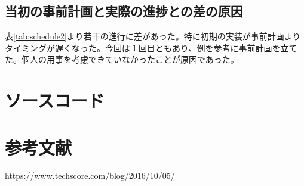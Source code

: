\documentclass[a4j]{jsarticle}
\begin{document}
  \subsection{当初の事前計画と実際の進捗との差の原因}
  表\ref{tab:schedule2}より若干の進行に差があった。特に初期の実装が事前計画よりタイミングが遅くなった。今回は１回目ともあり、例を参考に事前計画を立てた。個人の用事を考慮できていなかったことが原因であった。

  \clearpage
  \section{ソースコード}
  
  \clearpage

  
  \clearpage

  
  \clearpage

  
  \clearpage

  \section{参考文献}
  \begin{thebibliography}{99}
        https://www.techscore.com/blog/2016/10/05/%
  \end{thebibliography}
\end{document}
